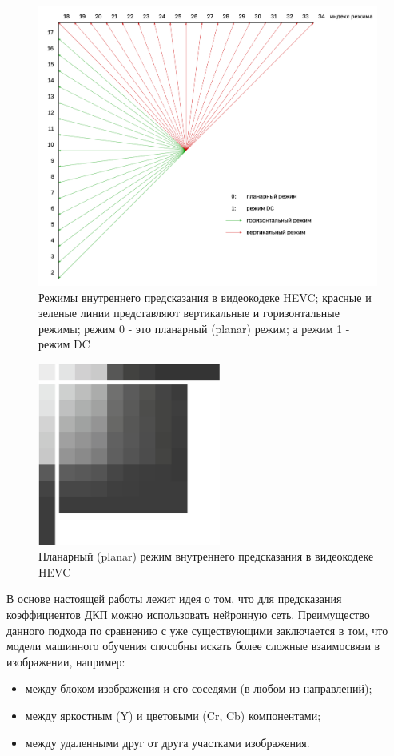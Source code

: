 \documentclass[times,specification,annotation]{itmo-student-thesis}
\begin{document}
\begin{figure}[!h]
    \centering
    \includegraphics[width=12cm]{./images/hevc-intra-prediction.png}
    \caption{Режимы внутреннего предсказания в видеокодеке HEVC; красные и зеленые линии представляют вертикальные и горизонтальные режимы; режим 0 - это планарный (planar) режим; а режим 1 - режим DC}
    \label{image:hevc-intra-prediction}
\end{figure}

\begin{figure}[!h]
    \centering
    \includegraphics[width=6cm]{./images/planar-inta-rediction.png}
    \caption{Планарный (planar) режим внутреннего предсказания в видеокодеке HEVC}
    \label{image:planar-inta-rediction}
\end{figure}

В основе настоящей работы лежит идея о том, что для предсказания коэффициентов ДКП можно использовать нейронную сеть. Преимущество данного подхода по сравнению с уже существующими заключается в том, что модели машинного обучения способны искать более сложные взаимосвязи в изображении, например:
\begin{itemize}
    \item между блоком изображения и его соседями (в любом из направлений);
    \item между яркостным (Y) и цветовыми (Cr, Cb) компонентами;
    \item между удаленными друг от друга участками изображения.
\end{itemize}
\end{document}
